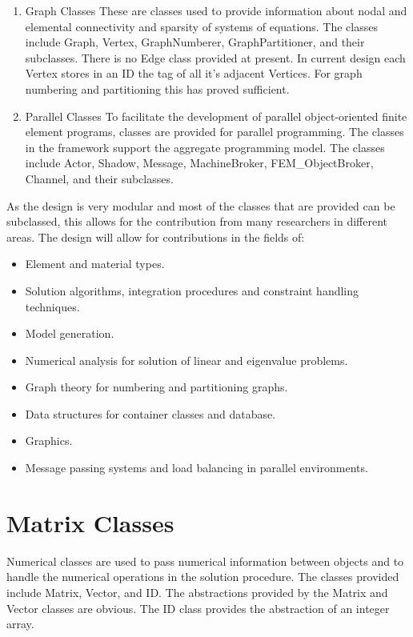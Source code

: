 \begin{enumerate}
\item{Graph Classes} These are classes used to provide information
about nodal and elemental connectivity and sparsity of systems of
equations. The classes include Graph, Vertex, GraphNumberer, 
GraphPartitioner, and their subclasses. There is no Edge class provided
at present. In current design each Vertex stores in an ID the tag of
all it's adjacent Vertices. For graph numbering and partitioning this
has proved sufficient.  

\item{Parallel Classes}
To facilitate the development of parallel object-oriented finite
element programs, classes are provided for parallel programming. The
classes in the framework support the aggregate programming model. The
classes include Actor, Shadow, Message, MachineBroker,
FEM\_ObjectBroker, Channel, and their subclasses.

\end{enumerate}

As the design is very modular and most of the classes that are
provided can be subclassed, this allows for the contribution from many
researchers in different areas. The design will allow for
contributions in the fields of: \begin{itemize}
\item Element and material types.
\item Solution algorithms, integration procedures and constraint
handling techniques.
\item Model generation.
\item Numerical analysis for solution of linear and eigenvalue
problems. 
\item Graph theory for numbering and partitioning graphs.
\item Data structures for container classes and database.
\item Graphics.
\item Message passing systems and load balancing in parallel environments.
\end{itemize}

\pagebreak
\tableofcontents

\pagebreak
\section{Matrix Classes}
Numerical classes are used to pass numerical information between
objects and to handle the numerical operations in the solution
procedure. The classes provided include Matrix, Vector, and ID.
The abstractions provided by the Matrix and Vector classes are
obvious. The ID class provides the abstraction of an integer array. 


